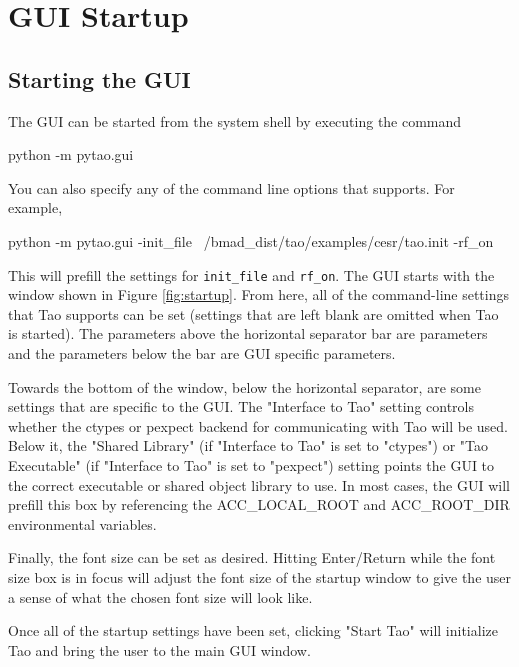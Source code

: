 \chapter{GUI Startup}
\label{s:gui.startup}

\section{Starting the GUI}

The GUI can be started from the system shell by executing the command
\begin{example}
  python -m pytao.gui
\end{example}
You can also specify any of the command line options that \tao supports.  For example,
\begin{example}
  python -m pytao.gui -init_file ~/bmad_dist/tao/examples/cesr/tao.init -rf_on
\end{example}
This will prefill the settings for \texttt{init_file} and \texttt{rf_on}. The GUI starts with the
window shown in Figure \ref{fig:startup}. From here, all of the command-line settings that Tao
supports can be set (settings that are left blank are omitted when Tao is started). The parameters
above the horizontal separator bar are \tao parameters and the parameters below the bar are GUI
specific parameters.

Towards the bottom of the window, below the horizontal separator, are some settings that are
specific to the GUI.  The "Interface to Tao" setting controls whether the ctypes or pexpect backend
for communicating with Tao will be used.  Below it, the "Shared Library" (if "Interface to Tao" is
set to "ctypes") or "Tao Executable" (if "Interface to Tao" is set to "pexpect") setting points the
GUI to the correct executable or shared object library to use.  In most cases, the GUI will prefill
this box by referencing the ACC_LOCAL_ROOT and ACC_ROOT_DIR environmental variables.

Finally, the font size can be set as desired. Hitting Enter/Return while the font size box is in
focus will adjust the font size of the startup window to give the user a sense of what the chosen
font size will look like.

Once all of the startup settings have been set, clicking "Start Tao" will initialize Tao and bring
the user to the main GUI window.

